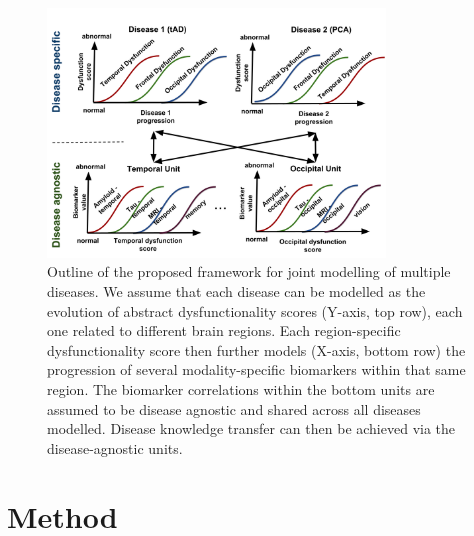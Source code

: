 \documentclass{llncs}
\begin{document}
% 
% 
% 
%


\begin{figure}[h]
 \centering
 \includegraphics[width=0.8\textwidth,trim=0 0 0 80,clip]{figures/disease_knowledge_transfer.png}
 \caption{Outline of the proposed framework for joint modelling of multiple diseases. We assume that each disease can be modelled as the evolution of abstract dysfunctionality scores (Y-axis, top row), each one related to different brain regions. Each region-specific dysfunctionality score then further models (X-axis, bottom row) the progression of several modality-specific biomarkers within that same region. The biomarker correlations within the bottom units are assumed to be disease agnostic and shared across all diseases modelled. Disease knowledge transfer can then be achieved via the disease-agnostic units.}
 \label{fig:diagram}
\end{figure}

\section{Method}
\end{document}

